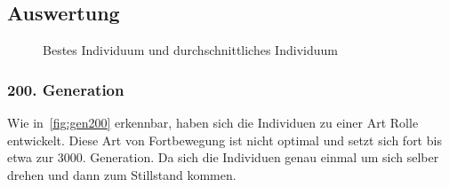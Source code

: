     \subsection{Auswertung}

      \begin{figure}[H]
        \centering
        
        \caption{Bestes Individuum und durchschnittliches Individuum\label{fig:graphFourth}}
      \end{figure}

      \subsubsection{200. Generation}

        Wie in~\vref{fig:gen200} erkennbar, haben sich die Individuen zu einer Art Rolle entwickelt.
        Diese Art von Fortbewegung ist nicht optimal und setzt sich fort bis etwa zur 3000. Generation.
        Da sich die Individuen genau einmal um sich selber drehen und dann zum Stillstand kommen.

        \vspace{0.5cm}

